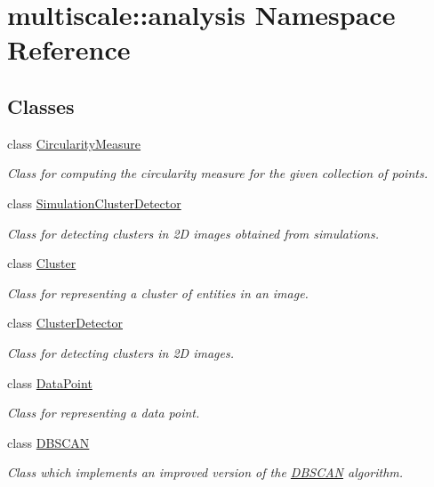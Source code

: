 \hypertarget{namespacemultiscale_1_1analysis}{\section{multiscale\-:\-:analysis Namespace Reference}
\label{namespacemultiscale_1_1analysis}
}
\subsection*{Classes}
\begin{DoxyCompactItemize}
\item 
class \hyperlink{classmultiscale_1_1analysis_1_1CircularityMeasure}{Circularity\-Measure}
\begin{DoxyCompactList}\small\item\em Class for computing the circularity measure for the given collection of points. \end{DoxyCompactList}\item 
class \hyperlink{classmultiscale_1_1analysis_1_1SimulationClusterDetector}{Simulation\-Cluster\-Detector}
\begin{DoxyCompactList}\small\item\em Class for detecting clusters in 2\-D images obtained from simulations. \end{DoxyCompactList}\item 
class \hyperlink{classmultiscale_1_1analysis_1_1Cluster}{Cluster}
\begin{DoxyCompactList}\small\item\em Class for representing a cluster of entities in an image. \end{DoxyCompactList}\item 
class \hyperlink{classmultiscale_1_1analysis_1_1ClusterDetector}{Cluster\-Detector}
\begin{DoxyCompactList}\small\item\em Class for detecting clusters in 2\-D images. \end{DoxyCompactList}\item 
class \hyperlink{classmultiscale_1_1analysis_1_1DataPoint}{Data\-Point}
\begin{DoxyCompactList}\small\item\em Class for representing a data point. \end{DoxyCompactList}\item 
class \hyperlink{classmultiscale_1_1analysis_1_1DBSCAN}{D\-B\-S\-C\-A\-N}
\begin{DoxyCompactList}\small\item\em Class which implements an improved version of the \hyperlink{classmultiscale_1_1analysis_1_1DBSCAN}{D\-B\-S\-C\-A\-N} algorithm. \end{DoxyCompactList}\item 

\end{DoxyCompactItemize}
